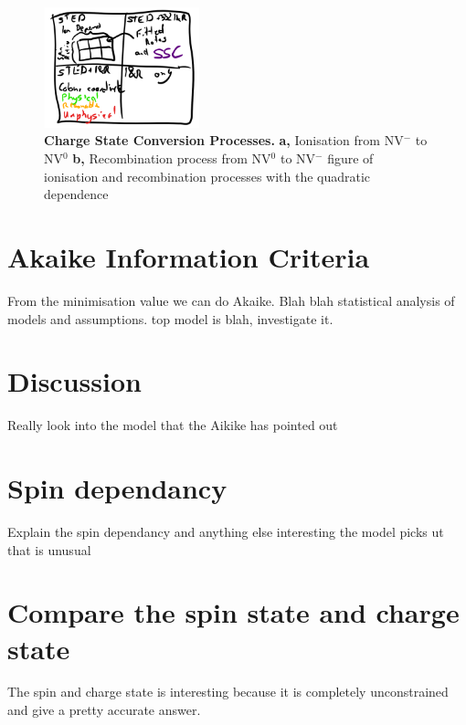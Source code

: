 \documentclass[preprint,prl]{revtex4}
\begin{document}
\begin{figure}[H]
  \centering
  \includegraphics[width=0.4\textwidth]{SubModels.png} 
 \caption{\textbf{Charge State Conversion Processes.} \textbf{a,} Ionisation from NV$^-$ to NV$^0$ \textbf{b,} Recombination process from NV$^0$ to NV$^-$ figure of ionisation and recombination processes with the quadratic dependence} \label{FigSubModels}
\end{figure}





\section{Akaike Information Criteria}
From the minimisation value we can do Akaike.
Blah blah statistical analysis of models and assumptions.
top model is blah, investigate it.

\section{Discussion}
Really look into the model that the Aikike has pointed out
\section{Spin dependancy}
Explain the spin dependancy and anything else interesting the model picks ut that is unusual
\section{Compare the spin state and charge state}
The spin and charge state is interesting because it is completely unconstrained and give a pretty accurate answer.
\end{document}
